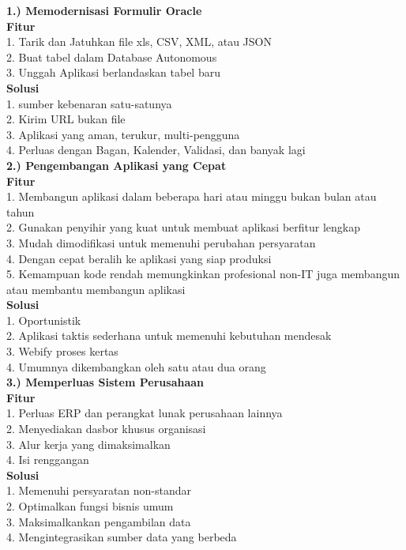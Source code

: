 \documentclass[12pt, times new roman, a4paper]{article}
\begin{document}
\textbf{1.) Memodernisasi Formulir Oracle}\\
\textbf{Fitur}\\
1. Tarik dan Jatuhkan file xls, CSV, XML, atau JSON\\
2. Buat tabel dalam Database Autonomous\\
3. Unggah Aplikasi berlandaskan tabel baru\\
\textbf{Solusi}\\
1. sumber kebenaran satu-satunya\\
2. Kirim URL bukan file\\
3. Aplikasi yang aman, terukur, multi-pengguna\\
4. Perluas dengan Bagan, Kalender, Validasi, dan banyak lagi\\
\textbf{2.) Pengembangan Aplikasi yang Cepat}\\
\textbf{Fitur}\\
1. Membangun aplikasi dalam beberapa hari atau minggu bukan bulan atau tahun\\
2. Gunakan penyihir yang kuat untuk membuat aplikasi berfitur lengkap\\
3. Mudah dimodifikasi untuk memenuhi perubahan persyaratan\\
4. Dengan cepat beralih ke aplikasi yang siap produksi\\
5. Kemampuan kode rendah memungkinkan profesional non-IT juga membangun atau membantu membangun aplikasi\\
\textbf{Solusi}\\
1. Oportunistik\\
2. Aplikasi taktis sederhana untuk memenuhi kebutuhan mendesak\\
3. Webify proses kertas\\
4. Umumnya dikembangkan oleh satu atau dua orang\\
\textbf{3.) Memperluas Sistem Perusahaan}\\
\textbf{Fitur}\\
1. Perluas ERP dan perangkat lunak perusahaan lainnya\\
2. Menyediakan dasbor khusus organisasi\\
3. Alur kerja yang dimaksimalkan\\
4. Isi renggangan\\
\textbf{Solusi}\\
1. Memenuhi persyaratan non-standar\\
2. Optimalkan fungsi bisnis umum\\
3. Maksimalkankan pengambilan data\\
4. Mengintegrasikan sumber data yang berbeda\\
\end{document}
